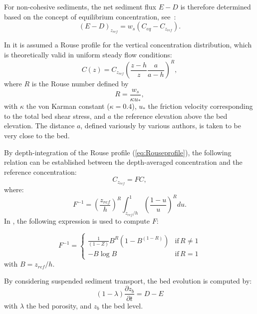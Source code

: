 For non-cohesive sediments, the net sediment flux $E-D$ is therefore determined based on the concept of equilibrium concentration, see~\cite{CelikRodi}:
\begin{equation}\label{eq:CelikRodi}
\left(E-D \right)_{z_{ref}} = w_s \left(C_{eq} - C_{z_{ref}}\right).
\end{equation}

In \sisyphe{} it is assumed a Rouse profile for the vertical concentration distribution,
which is theoretically valid in uniform steady flow conditions:
\begin{equation}\label{eq:Rouseprofile}
C(z)=C_{z_{ref}}\left(\frac{z-h}{z}\frac{a}{a-h}\right)^R, 
\end{equation}
where $R$ is the Rouse number defined by
\begin{equation}\label{eq:R}
R=\frac{w_s}{\kappa u_*}, 
\end{equation}
with $\kappa$ the von Karman constant ($\kappa = 0.4$), $u_*$ the
friction velocity corresponding to the total bed shear stress, and $a$ the reference elevation above the bed elevation. The distance $a$, defined variously by
various authors, is taken to be very close to the bed.

By depth-integration of the Rouse profile (\ref{eq:Rouseprofile}), the following relation
can be established between the depth-averaged concentration and the reference concentration:
\begin{equation*}
  C_{z_{ref}} = F C,
\end{equation*}
where:
\begin{equation}\label{eq:Rouseprofile}
F^{-1} = \left(\frac{z_{ref}}{h}\right)^R\int_{z_{ref}/h}^1\left(\frac{1-u}{u}\right)^R du. 
\end{equation}
In \sisyphe{}, the following expression is used to compute $F$:

\begin{equation*}
F^{-1}=\left\{\begin{array}{ll}
\frac{1}{\left(1-Z\right)} B^R\left( 1-B^{(1-R)} \right) & \text{if}\,R \neq 1\\
-B \log B &  \text{if}\,R = 1
\end{array}
\right.
\end{equation*}
with $B = z_{ref}/h$.

By considering suspended sediment transport, the bed evolution is computed by: %
\begin{equation*}
(1-\lambda)\frac{\partial z_b}{\partial t} = D - E
\end{equation*}
with $\lambda$ the bed porosity, and $z_b$ the bed level.

